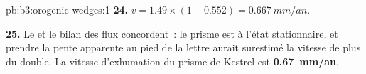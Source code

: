 \begin{solution}{pb:b3:orogenic-wedges:1}
\textbf{24.} $v = 1.49\times(1 - 0.552) = \qty{0.667}{mm/an}$.

\textbf{25.} Le  et le bilan des flux concordent~: le prisme est
à l'état stationnaire, et prendre la pente apparente au pied de la lettre aurait
surestimé la vitesse de plus du double. La vitesse d'exhumation du prisme
de Kestrel est \textbf{\qty[text-series-to-math=true]{0.67}{mm/an}}.
\end{solution}
